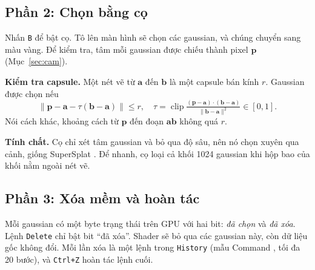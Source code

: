 \documentclass[9pt,twocolumn,a4paper]{extarticle}
\newcommand{\code}[1]{\texttt{#1}}
\begin{document}
\subsection{Phần 2: Chọn bằng cọ}
Nhấn \code{B} để bật cọ. Tô lên màn hình sẽ chọn các gaussian, và chúng chuyển sang màu vàng. Để kiểm tra, tâm mỗi gaussian được chiếu thành pixel $\mathbf{p}$ (Mục~\ref{sec:cam}).

\textbf{Kiểm tra capsule.} Một nét vẽ từ $\mathbf{a}$ đến $\mathbf{b}$ là một capsule bán kính $r$. Gaussian được chọn nếu
\begin{equation}
\lVert\mathbf{p}-\mathbf{a}-\tau(\mathbf{b}-\mathbf{a})\rVert\le r,\quad \tau=\operatorname{clip}\tfrac{(\mathbf{p}-\mathbf{a})\cdot(\mathbf{b}-\mathbf{a})}{\lVert\mathbf{b}-\mathbf{a}\rVert^2}\in[0,1].
\label{eq:capsule}
\end{equation}
Nói cách khác, khoảng cách từ $\mathbf{p}$ đến đoạn $\mathbf{ab}$ không quá $r$.

\par\noindent{}\par\vspace{3pt}
 

\textbf{Tính chất.} Cọ chỉ xét tâm gaussian và bỏ qua độ sâu, nên nó chọn xuyên qua cảnh, giống SuperSplat \cite{supersplat}. Để nhanh, cọ loại cả khối 1024 gaussian khi hộp bao của khối nằm ngoài nét vẽ.

\subsection{Phần 3: Xóa mềm và hoàn tác}
Mỗi gaussian có một byte trạng thái trên GPU với hai bit: \emph{đã chọn} và \emph{đã xóa}. Lệnh \code{Delete} chỉ bật bit ``đã xóa''. Shader sẽ bỏ qua các gaussian này, còn dữ liệu gốc không đổi. Mỗi lần xóa là một lệnh trong \code{History} (mẫu Command \cite{gamma1994design}, tối đa 20 bước), và \code{Ctrl+Z} hoàn tác lệnh cuối.

\par\noindent{}\par\vspace{3pt}
\end{document}
